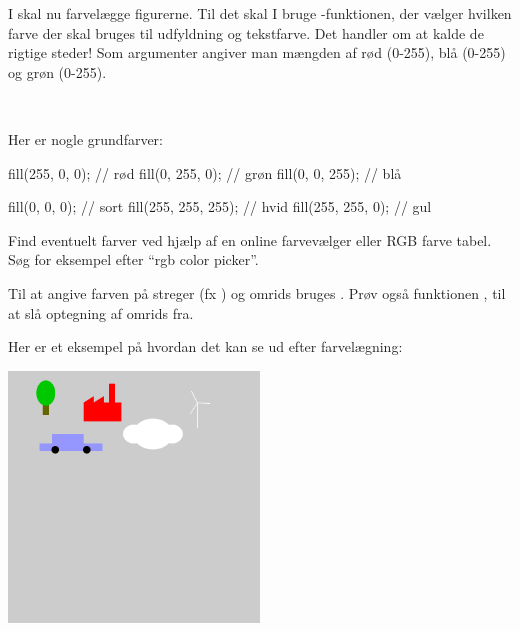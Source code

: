\documentclass{ucph-handout}
\begin{document}
\begin{exercisebox}[adjusted title=Farver]
I skal nu farvelægge figurerne. Til det skal I bruge
-funktionen, der vælger hvilken farve der skal
bruges til udfyldning og tekstfarve. Det handler om at kalde
 de rigtige steder! Som argumenter angiver man mængden
af rød (0-255), blå (0-255) og grøn (0-255).

~

\noindent
Her er nogle grundfarver:

\begin{minipage}{0.45\linewidth}
\begin{javascript}
fill(255, 0, 0);  // rød
fill(0, 255, 0);  // grøn
fill(0, 0, 255);  // blå
\end{javascript}
\end{minipage}
\begin{minipage}{0.45\linewidth}
\begin{javascript}
fill(0, 0, 0);       // sort
fill(255, 255, 255); // hvid
fill(255, 255, 0);   // gul
\end{javascript}
\end{minipage}

\noindent
Find eventuelt farver ved hjælp af en online farvevælger eller RGB
farve tabel. Søg for eksempel efter ``rgb color picker''.

Til at angive farven på streger (fx ) og omrids
bruges . Prøv også funktionen ,
til at slå optegning af omrids fra.
\end{exercisebox}

\newpage
\begin{exercisebox}[adjusted title=Eksempel]
Her er et eksempel på hvordan det kan se ud efter farvelægning:
\begin{center}
\includegraphics[width=0.5\textwidth]{../illustrations/images/farvelagt.png}
\end{center}
\end{exercisebox}
\end{document}
